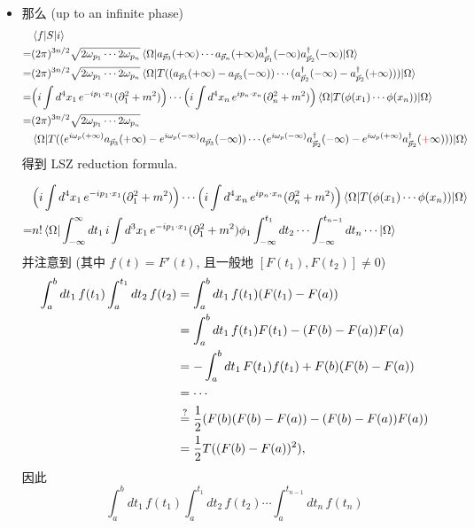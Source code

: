 \begin{itemize}
	\item 那么 (up to an infinite phase)
	\begin{align}
		& \braket{f | S | i} \notag \\
		=& (2 \pi)^{3 n / 2} \sqrt{2 \omega_{p_1} \cdots 2 \omega_{p_n}} \braket{\Omega | a_{\vec{p}_3}(+ \infty) \cdots a_{\vec{p}_n}(+ \infty) a^\dag_{\vec{p}_1}(- \infty) a^\dag_{\vec{p}_2}(- \infty) | \Omega} \notag \\
		=& (2 \pi)^{3 n / 2} \sqrt{2 \omega_{p_1} \cdots 2 \omega_{p_n}} \braket{\Omega | T ((a_{\vec{p}_3}(+ \infty) - a_{\vec{p}_3}(- \infty)) \cdots (a^\dag_{\vec{p}_2}(\mathcolor{red}{-} \infty) - a^\dag_{\vec{p}_2}(\mathcolor{red}{+} \infty))) | \Omega} \notag \\
		=& \Big( i \int d^4 x_1 \, e^{- i p_1 \cdot x_1} (\partial_1^2 + m^2) \Big) \cdots \Big( i \int d^4 x_n \, e^{i p_n \cdot x_n} (\partial_n^2 + m^2) \Big) \braket{\Omega | T(\phi(x_1) \cdots \phi(x_n)) | \Omega} \notag \\
		=& (2 \pi)^{3 n / 2} \sqrt{2 \omega_{p_1} \cdots 2 \omega_{p_n}} \notag \\
		& \braket{\Omega | T ((e^{i \omega_p (+ \infty)} a_{\vec{p}_3}(+ \infty) - e^{i \omega_p (- \infty)} a_{\vec{p}_3}(- \infty)) \cdots (e^{i \omega_p (- \infty)} a^\dag_{\vec{p}_2}(\mathcolor{red}{-} \infty) - e^{i \omega_p (+ \infty)} a^\dag_{\vec{p}_2}(\mathcolor{red}{+} \infty))) | \Omega}
	\end{align}
	得到 LSZ reduction formula.
	
	\begin{tcolorbox}[title=calculation:]
		\begin{align}
			& \Big( i \int d^4 x_1 \, e^{- i p_1 \cdot x_1} (\partial_1^2 + m^2) \Big) \cdots \Big( i \int d^4 x_n \, e^{i p_n \cdot x_n} (\partial_n^2 + m^2) \Big) \braket{\Omega | T(\phi(x_1) \cdots \phi(x_n)) | \Omega} \notag \\
			=& n! \braket{\Omega | \int_{- \infty}^\infty dt_1 \, i \int d^3 x_1 \, e^{- i p_1 \cdot x_1} (\partial_1^2 + m^2) \phi_1 \int_{- \infty}^{t_1} dt_2 \cdots \int_{- \infty}^{t_{n - 1}} dt_n \cdots | \Omega}
		\end{align}
		并注意到 (其中 $f(t) = F'(t)$, 且一般地 $[F(t_1), F(t_2)] \neq 0$)
		\begin{align}
			\int_a^b dt_1 \, f(t_1) \int_a^{t_1} dt_2 \, f(t_2) &= \int_a^b dt_1 \, f(t_1) (F(t_1) - F(a)) \notag \\
			&= \int_a^b dt_1 \, f(t_1) F(t_1) - (F(b) - F(a)) F(a) \notag \\
			&= - \int_a^b dt_1 \, F(t_1) f(t_1) + F(b) (F(b) - F(a)) \notag \\
			&= \cdots \notag \\
			&\overset{?}{=} \frac{1}{2} (F(b) (F(b) - F(a)) - (F(b) - F(a)) F(a)) \notag \\
			&= \frac{1}{2} T((F(b) - F(a))^2),
		\end{align}
		因此
		\begin{equation}
			\int_a^b dt_1 \, f(t_1) \int_a^{t_1} dt_2 \, f(t_2) \cdots \int_a^{t_{n - 1}} dt_n \, f(t_n)
		\end{equation}
	\end{tcolorbox}
\end{itemize}

